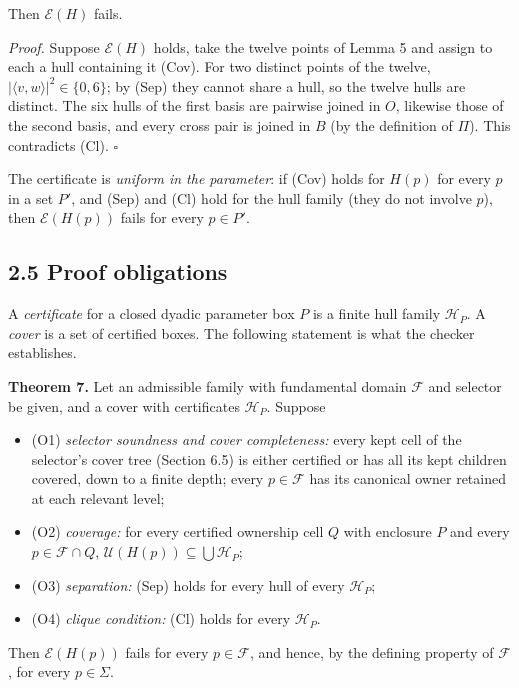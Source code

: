 \documentclass[
  11pt,
]{article}
\providecommand{\tightlist}{%
  \setlength{\itemsep}{0pt}\setlength{\parskip}{0pt}}
\begin{document}
Then \(\mathcal E(H)\) fails.

\emph{Proof.} Suppose \(\mathcal E(H)\) holds, take the twelve points of
Lemma 5 and assign to each a hull containing it (Cov). For two distinct
points of the twelve, \(|\langle v,w\rangle|^2\in\{0,6\}\); by (Sep)
they cannot share a hull, so the twelve hulls are distinct. The six
hulls of the first basis are pairwise joined in \(O\), likewise those of
the second basis, and every cross pair is joined in \(B\) (by the
definition of \(\Pi\)). This contradicts (Cl). \(\square\)

The certificate is \emph{uniform in the parameter}: if (Cov) holds for
\(H(p)\) for every \(p\) in a set \(P'\), and (Sep) and (Cl) hold for
the hull family (they do not involve \(p\)), then \(\mathcal E(H(p))\)
fails for every \(p\in P'\).

\subsection{2.5 Proof obligations}\label{proof-obligations}

A \emph{certificate} for a closed dyadic parameter box \(P\) is a finite
hull family \(\mathcal H_P\). A \emph{cover} is a set of certified
boxes. The following statement is what the checker establishes.

\textbf{Theorem 7.} Let an admissible family with fundamental domain
\(\mathcal F\) and selector be given, and a cover with certificates
\(\mathcal H_P\). Suppose

\begin{itemize}
\tightlist
\item
  (O1) \emph{selector soundness and cover completeness:} every kept cell
  of the selector's cover tree (Section 6.5) is either certified or has
  all its kept children covered, down to a finite depth; every
  \(p\in\mathcal F\) has its canonical owner retained at each relevant
  level;
\item
  (O2) \emph{coverage:} for every certified ownership cell \(Q\) with
  enclosure \(P\) and every \(p\in\mathcal F\cap Q\),
  \(\mathcal U(H(p))\subseteq\bigcup\mathcal H_P\);
\item
  (O3) \emph{separation:} (Sep) holds for every hull of every
  \(\mathcal H_P\);
\item
  (O4) \emph{clique condition:} (Cl) holds for every \(\mathcal H_P\).
\end{itemize}

Then \(\mathcal E(H(p))\) fails for every \(p\in\mathcal F\), and hence,
by the defining property of \(\mathcal F\), for every \(p\in\Sigma\).
\end{document}
